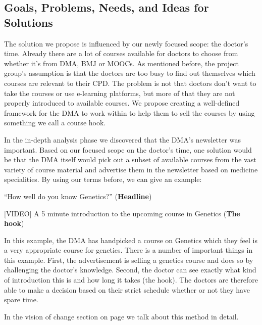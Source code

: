 \subsection{Goals, Problems, Needs, and Ideas for Solutions}

The solution we propose is influenced by our newly focused scope: the doctor’s time. Already there are a lot of courses available for doctors to choose from whether it’s from DMA, BMJ or MOOCs. As mentioned before, the project group’s assumption is that the doctors are too busy to find out themselves which courses are relevant to their CPD. The problem is not that doctors don’t want to take the courses or use e-learning platforms, but more of that they are not properly introduced to available courses. We propose creating a well-defined framework for the DMA to work within to help them to sell the courses by using something we call a course hook.

In the in-depth analysis phase we discovered that the DMA’s newsletter was important. Based on our focused scope on the doctor’s time, one solution would be that the DMA itself would pick out a subset of available courses from the vast variety of course material and advertise them in the newsletter based on medicine specialities. By using our terms before, we can give an example:


\begin{center}
“How well do you know Genetics?” (\textbf{Headline})

[VIDEO] A 5 minute introduction to the upcoming course in Genetics (\textbf{The hook})
\end{center}

In this example, the DMA has handpicked a course on Genetics which they feel is a very appropriate course for genetics. There is a number of important things in this example. First, the advertisement is selling a genetics course and does so by challenging the doctor’s knowledge. Second, the doctor can see exactly what kind of introduction this is and how long it takes (the hook). The doctors are therefore able to make a decision based on their strict schedule whether or not they have spare time.

In the vision of change section on page \pageref{sec:vision} we talk about this method in detail.

